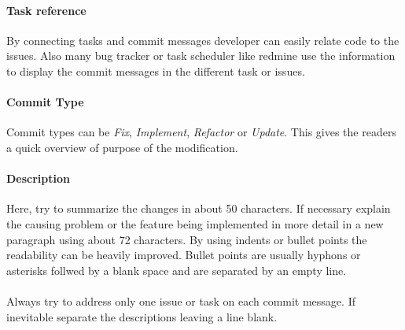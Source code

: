 \paragraph{Task reference}
By connecting tasks and commit messages developer can easily relate code to the issues. Also many bug tracker or task scheduler like redmine use the information to display the commit messages in the different task or issues.
\paragraph{Commit Type}
Commit types can be \textit{Fix}, \textit{Implement}, \textit{Refactor} or \textit{Update}. This gives the readers a quick overview of purpose of the modification.
\paragraph{Description}
Here, try to summarize the changes in about 50 characters. 
If necessary explain the causing problem or the feature being implemented in more detail in a new paragraph using about 72 characters. By using indents or bullet points the readability can be heavily improved. Bullet points are usually hyphons or asterisks follwed by a blank space and are separated by an empty line.
\\\\
Always try to address only one issue or task on each commit message. If inevitable separate the descriptions leaving a line blank.


